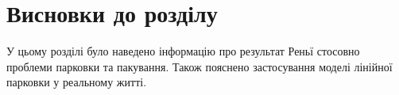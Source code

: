 \section{Висновки до розділу}

У цьому розділі було наведено інформацію про результат Реньї стосовно проблеми парковки та пакування. Також пояснено застосування моделі лінійної парковки у реальному житті.